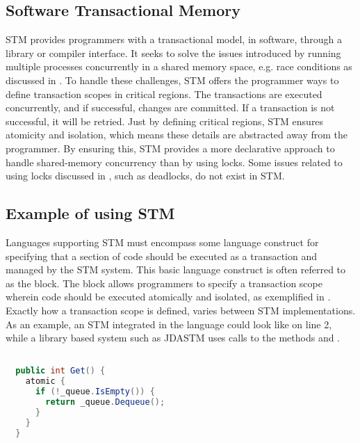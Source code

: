 \subsection{Software Transactional Memory}
\ac{STM} provides programmers with a transactional model, in software, through a library or compiler interface\cite{herlihy2011tm}. It seeks to solve the issues introduced by running multiple processes concurrently in a shared memory space, e.g. race conditions as discussed in \cite[p. 22-26]{dpt907e14trending}. To handle these challenges, \ac{STM} offers the programmer ways to define transaction scopes in critical regions. The transactions are executed concurrently, and if successful, changes are committed. If a transaction is not successful, it will be retried. Just by defining critical regions, \ac{STM} ensures atomicity and isolation, which means these details are abstracted away from the programmer\cite[p. 48]{harris2005composable}. By ensuring this, \ac{STM} provides a more declarative approach to handle shared-memory concurrency than by using locks. Some issues related to using locks discussed in \cite[p. 26-30]{dpt907e14trending}, such as deadlocks, do not exist in \ac{STM}.

\subsection{Example of using STM}
\label{sec:stm_keyconcepts_example}
Languages supporting \ac{STM} must encompass some language construct for specifying that a section of code should be executed as a transaction and managed by the \ac{STM} system. This basic language construct is often referred to as the  block\cite[p. 49]{harris2005composable}\cite[p. 3]{harris2003language}. The  block allows programmers to specify a transaction scope wherein code should be executed atomically and isolated, as exemplified in . Exactly how a transaction scope is defined, varies between \ac{STM} implementations. As an example, an \ac{STM} integrated in the language could look like  on line 2, while a library based system such as JDASTM\cite{ramadan2009committing} uses calls to the methods  and .

\begin{lstlisting}[float, label=lst:stm_atomic_block,
  caption={Threadsafe queue},
  language=Java,  
  showspaces=false,
  showtabs=false,
  breaklines=true,
  showstringspaces=false,
  breakatwhitespace=true,
  commentstyle=\color{greencomments},
  keywordstyle=\color{bluekeywords},
  stringstyle=\color{redstrings},
  morekeywords={atomic, retry, orElse}]  % Start your code-block

  public int Get() { 
    atomic {
      if (!_queue.IsEmpty()) {
        return _queue.Dequeue();
      }
    }
  }
\end{lstlisting}

